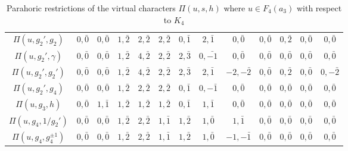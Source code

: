 \begin{landscape}
\begin{table}[!ht]
{\begin{tabular}{|c|cccc|cccc|cccc|}
        $\Pi(u,g_2',g_2)$ & $0,\bar0$ & $0,\bar0$ & $1,\bar2$ & $2,\bar2$ & $2,\bar2$ & $0,\bar1$ & $2,\bar1$ & $0,\bar0$ & $0,\bar0$ & $0,\bar2$ & $0,\bar0$ & $0,\bar0$\\

        $\Pi(u,g_2',\gamma)$ & $0,\bar0$ & $0,\bar0$ & $1,\bar2$ & $4,\bar2$ & $2,\bar2$ & $2,\bar{3}$ & $0,\bar{-1}$ & $0,\bar0$ & $0,\bar0$ & $0,\bar0$ & $0,\bar0$ & $0,\bar0$\\

        $\Pi(u,g_2',g_2')$ & $0,\bar0$ & $0,\bar0$ & $1,\bar2$ & $4,\bar2$ & $2,\bar2$ & $2,\bar{3}$ & $2,\bar1$ & $-2,-\bar2$ & $0,\bar0$ & $0,\bar2$ & $0,\bar0$ & $0,-\bar2$\\

        $\Pi(u,g_2',g_4)$  & $0,\bar0$ & $0,\bar0$ & $1,\bar2$ & $2,\bar2$ & $2,\bar2$ & $0,\bar1$ & $0,-\bar1$ & $0,\bar0$ & $0,\bar0$ & $0,\bar0$ & $0,\bar0$ & $0,\bar0$ \\\hline

        $\Pi(u,g_3,h)$  & $0,\bar0$ & $1,\bar1$ & $1,\bar2$ & $1,\bar2$ & $1,\bar2$ & $0,\bar1$ & $1,\bar1$ & $0,\bar0$ & $0,\bar0$ & $0,\bar0$ & $0,\bar0$ & $0,\bar0$ \\\hline
        $\Pi(u,g_4,1/g_2')$ & {$0,\bar0$} & {$0,\bar0$} & {$1,\bar2$} & {$2,\bar2$} & {$1,\bar1$} & {$1,\bar2$} & {$1,\bar0$} & {$1,\bar1$} & {$0,\bar0$} & {$0,\bar0$} & {$0,\bar0$} & {$0,\bar0$} \\
        $\Pi(u,g_4,g_4^{\pm1})$ & {$0,\bar0$} & {$0,\bar0$} & {$1,\bar2$} & {$2,\bar2$} & {$1,\bar1$} & {$1,\bar2$} & {$1,\bar0$} & {$-1,-\bar1$} & {$0,\bar0$} & {$0,\bar0$} & {$0,\bar0$} & {$0,\bar0$} \\\hline
        \end{tabular}
        }
        \caption{Parahoric restrictions of the virtual characters $\Pi(u,s,h)$ where $u\in F_4(a_3)$ with respect to $K_4$}
    \end{table}

\end{landscape}

